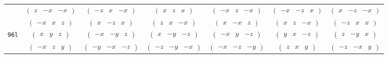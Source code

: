 \documentclass[fleqn,9pt,landscape]{jsarticle}
\begin{document}
\begin{center}
\begin{longtable}{ccccccc}
& $ \begin{pmatrix} z & - x & - x \end{pmatrix} $ & $ \begin{pmatrix} - z & x & - x \end{pmatrix} $ & $ \begin{pmatrix} x & z & x \end{pmatrix} $ & $ \begin{pmatrix} - x & z & - x \end{pmatrix} $ & $ \begin{pmatrix} - x & - z & x \end{pmatrix} $ & $ \begin{pmatrix} x & - z & - x \end{pmatrix} $ \\
& $ \begin{pmatrix} - x & x & z \end{pmatrix} $ & $ \begin{pmatrix} x & - z & x \end{pmatrix} $ & $ \begin{pmatrix} z & x & - x \end{pmatrix} $ & $ \begin{pmatrix} x & - x & z \end{pmatrix} $ & $ \begin{pmatrix} x & z & - x \end{pmatrix} $ & $ \begin{pmatrix} - z & x & x \end{pmatrix} $ \\ \hline
{\tt 96l} & $ \begin{pmatrix} x & y & z \end{pmatrix} $ & $ \begin{pmatrix} - x & - y & z \end{pmatrix} $ & $ \begin{pmatrix} x & - y & - z \end{pmatrix} $ & $ \begin{pmatrix} - x & y & - z \end{pmatrix} $ & $ \begin{pmatrix} y & x & - z \end{pmatrix} $ & $ \begin{pmatrix} z & - y & x \end{pmatrix} $ \\
& $ \begin{pmatrix} - x & z & y \end{pmatrix} $ & $ \begin{pmatrix} - y & - x & - z \end{pmatrix} $ & $ \begin{pmatrix} - z & - y & - x \end{pmatrix} $ & $ \begin{pmatrix} - x & - z & - y \end{pmatrix} $ & $ \begin{pmatrix} z & x & y \end{pmatrix} $ & $ \begin{pmatrix} - z & - x & y \end{pmatrix} $ \\

\end{longtable}
\end{center}
\end{document}
